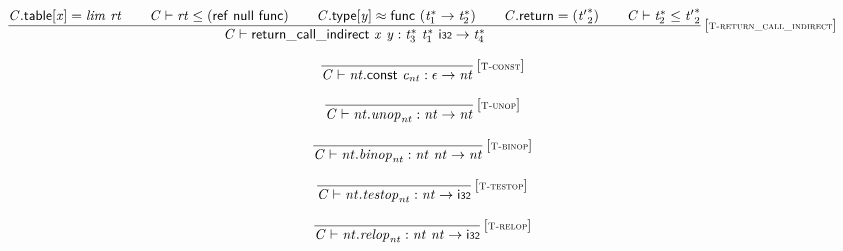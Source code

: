 $$
\begin{array}{@{}c@{}}\displaystyle
\frac{
{\mathit{C}}.\mathsf{table}{}[{\mathit{x}}] = {\mathit{lim}}~{\mathit{rt}}
 \qquad
{\mathit{C}} \vdash {\mathit{rt}} \leq (\mathsf{ref}~\mathsf{null}~\mathsf{func})
 \qquad
{\mathit{C}}.\mathsf{type}{}[{\mathit{y}}] \approx \mathsf{func}~({{\mathit{t}}_{{1}}^\ast} \rightarrow {{\mathit{t}}_{{2}}^\ast})
 \qquad
{\mathit{C}}.\mathsf{return} = ({{\mathit{t}'}_{{2}}^\ast})
 \qquad
{\mathit{C}} \vdash {{\mathit{t}}_{{2}}^\ast} \leq {{\mathit{t}'}_{{2}}^\ast}
}{
{\mathit{C}} \vdash \mathsf{return\_call\_indirect}~{\mathit{x}}~{\mathit{y}} : {{\mathit{t}}_{{3}}^\ast}~{{\mathit{t}}_{{1}}^\ast}~\mathsf{i{\scriptstyle32}} \rightarrow {{\mathit{t}}_{{4}}^\ast}
} \, {[\textsc{\scriptsize T{-}return\_call\_indirect}]}
\qquad
\end{array}
$$

\vspace{1ex}

$$
\begin{array}{@{}c@{}}\displaystyle
\frac{
}{
{\mathit{C}} \vdash {\mathit{nt}}.\mathsf{const}~{\mathit{c}}_{{\mathit{nt}}} : \epsilon \rightarrow {\mathit{nt}}
} \, {[\textsc{\scriptsize T{-}const}]}
\qquad
\end{array}
$$

$$
\begin{array}{@{}c@{}}\displaystyle
\frac{
}{
{\mathit{C}} \vdash {\mathit{nt}} . {\mathit{unop}}_{{\mathit{nt}}} : {\mathit{nt}} \rightarrow {\mathit{nt}}
} \, {[\textsc{\scriptsize T{-}unop}]}
\qquad
\end{array}
$$

$$
\begin{array}{@{}c@{}}\displaystyle
\frac{
}{
{\mathit{C}} \vdash {\mathit{nt}} . {\mathit{binop}}_{{\mathit{nt}}} : {\mathit{nt}}~{\mathit{nt}} \rightarrow {\mathit{nt}}
} \, {[\textsc{\scriptsize T{-}binop}]}
\qquad
\end{array}
$$

$$
\begin{array}{@{}c@{}}\displaystyle
\frac{
}{
{\mathit{C}} \vdash {\mathit{nt}} . {\mathit{testop}}_{{\mathit{nt}}} : {\mathit{nt}} \rightarrow \mathsf{i{\scriptstyle32}}
} \, {[\textsc{\scriptsize T{-}testop}]}
\qquad
\end{array}
$$

$$
\begin{array}{@{}c@{}}\displaystyle
\frac{
}{
{\mathit{C}} \vdash {\mathit{nt}} . {\mathit{relop}}_{{\mathit{nt}}} : {\mathit{nt}}~{\mathit{nt}} \rightarrow \mathsf{i{\scriptstyle32}}
} \, {[\textsc{\scriptsize T{-}relop}]}
\qquad
\end{array}
$$

